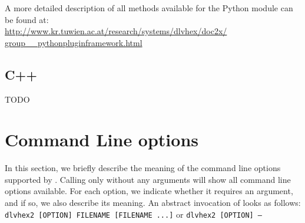 \documentclass[a4paper, titlepage]{article}
\begin{document}
A more detailed description of all methods available for the \dlvhex{} Python module can be found at:\\ \url{http://www.kr.tuwien.ac.at/research/systems/dlvhex/doc2x/}\\
\url{group__pythonpluginframework.html}
\subsection{C++}
TODO

\section{Command Line options}
\label{sec:commandline}
In this section, we briefly describe the meaning of the command line options supported by \dlvhex{}. 
Calling only \dlvhex{} without any arguments will show all 
command line options available. For each option, we indicate whether it requires an argument, and if so, we also describe its meaning. An abstract invocation of \dlvhex{} looks as follows:\\
\texttt{dlvhex2 [OPTION] FILENAME [FILENAME ...]} or \texttt{dlvhex2 [OPTION] --}
\end{document}
